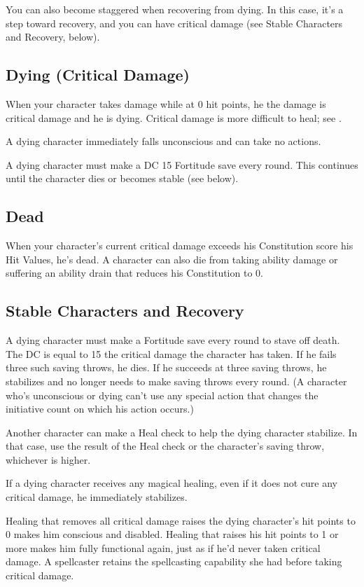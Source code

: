 You can also become staggered when recovering from dying. In this case, it's a step toward recovery, and you can have critical damage (see Stable Characters and Recovery, below).

\subsection{Dying (Critical Damage)}
When your character takes damage while at 0 hit points, he the damage is critical damage and he is dying. Critical damage is more difficult to heal; see .

A dying character immediately falls unconscious and can take no actions.

A dying character must make a DC 15 Fortitude save every round. This continues until the character dies or becomes stable (see below).

\subsection{Dead}
When your character's current critical damage exceeds his Constitution score \add his Hit Values, he's dead. A character can also die from taking ability damage or suffering an ability drain that reduces his Constitution to 0.

\subsection{Stable Characters and Recovery}
A dying character must make a Fortitude save every round to stave off death. The DC is equal to 15 \add the critical damage the character has taken. If he fails three such saving throws, he dies. If he succeeds at three saving throws, he stabilizes and no longer needs to make saving throws every round. (A character who's unconscious or dying can't use any special action that changes the initiative count on which his action occurs.)

\par Another character can make a Heal check to help the dying character stabilize. In that case, use the result of the Heal check or the character's saving throw, whichever is higher.

\par If a dying character receives any magical healing, even if it does not cure any critical damage, he immediately stabilizes.

\par Healing that removes all critical damage raises the dying character's hit points to 0 makes him conscious and disabled. Healing that raises his hit points to 1 or more makes him fully functional again, just as if he'd never taken critical damage. A spellcaster retains the spellcasting capability she had before taking critical damage.

